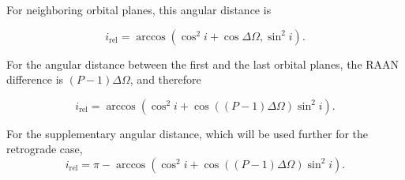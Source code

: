For neighboring orbital planes, this angular distance is

\begin{equation}
i_{\mathrm{rel}}=\arccos\left(\cos^2 i+\cos\Delta\Omega,\sin^2 i\right).
\end{equation}

For the angular distance between the first and the last orbital planes, the RAAN difference is $(P-1)\Delta\Omega$, and therefore

\begin{equation}
i_{\mathrm{rel}}=\arccos\left(\cos^2 i+\cos\left((P-1)\Delta\Omega\right)\sin^2 i\right).
\end{equation}

For the supplementary angular distance, which will be used further for the retrograde case,
\begin{equation}
i_{\mathrm{rel}}=\pi-\arccos\left(\cos^2 i+\cos\left((P-1)\Delta\Omega\right)\sin^2 i\right).
\end{equation}
